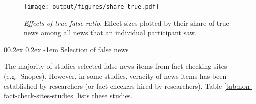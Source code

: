 \documentclass[
  man]{apa6}
\makeatletter
\let\oldparagraph\paragraph
\renewcommand{\paragraph}{
    \@ifstar
      \xxxParagraphStar
      \xxxParagraphNoStar
  }
\newcommand{\xxxParagraphStar}[1]{\oldparagraph*{#1}\mbox{}}
\newcommand{\xxxParagraphNoStar}[1]{\oldparagraph{#1}\mbox{}}
\renewcommand{\paragraph}{\@startsection{paragraph}{4}{\parindent}%
  {0\baselineskip \@plus 0.2ex \@minus 0.2ex}%
  {-1em}%
  {\normalfont\normalsize\bfseries\itshape\typesectitle}}
\makeatother
\begin{document}
\begin{figure}
\centering
\texttt{[image: output/figures/share-true.pdf]}
\caption{\label{fig:share-true}\emph{Effects of true-false ratio}. Effect sizes plotted by their share of true news among all news that an individual participant saw.}
\end{figure}

\paragraph{Selection of false news}\label{selection-of-false-news}

The majority of studies selected false news items from fact checking sites (e.g.~Snopes). However, in some studies, veracity of news items has been established by researchers (or fact-checkers hired by researchers). Table \ref{tab:non-fact-check-sites-studies} lists these studies.
\end{document}

